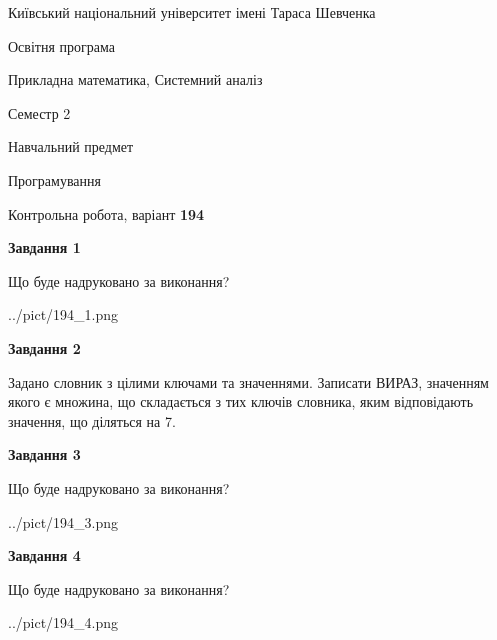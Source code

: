 \documentclass[12pt, ukrainian]{article}
\begin{document}
{{\begin {small}\par
{ \center  Київський національний університет імені Тараса Шевченка \par}
{\parbox {5 cm}{Освітня програма \hfill}{\parbox {8 cm}{Прикладна математика, Системний аналіз \hfill}}\parbox {5 cm}{\hfill Семестр 2}}\par
{\parbox {5 cm} {Навчальний предмет \hfill}\parbox {7 cm}{Програмування \hfill}\parbox {6cm}{\hfill}\par}\vspace{-7pt} \end{small}}{\center Контрольна робота, варіант  \No \textbf
{ 194 }\par}}
{
\begin {large}
{\begin {center}\textbf{Завдання 1}\end {center}}\par
Що буде надруковано за виконання?\par\par
\begin{center}
	{../pict/194_1.png}
\end{center}
\newpage

{\begin {center}\textbf{Завдання 2}\end {center}}\par
Задано словник  з цілими ключами та значеннями. Записати ВИРАЗ, значенням якого є множина, що складається  з тих ключів словника, яким відповідають значення, що діляться на 7.\par
\newpage

{\begin {center}\textbf{Завдання 3}\end {center}}\par
Що буде надруковано за виконання?
\begin{center}
	{../pict/194_3.png}
\end{center}
\newpage

{\begin {center}\textbf{Завдання 4}\end {center}}\par
Що буде надруковано за виконання?\par
\begin{center}
	{../pict/194_4.png}
\end{center}
\newpage


\end{large}}
\end{document}
